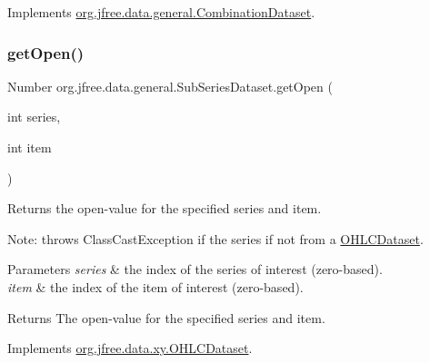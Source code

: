 Implements \mbox{\hyperlink{interfaceorg_1_1jfree_1_1data_1_1general_1_1_combination_dataset_a66aff831b2ae72a85d4485c56f8b0d21}{org.\+jfree.\+data.\+general.\+Combination\+Dataset}}.

\mbox{\label{classorg_1_1jfree_1_1data_1_1general_1_1_sub_series_dataset_aaa997e001d9ecd85cb2ecb628048e3ab}} 
\subsubsection{\texorpdfstring{get\+Open()}{getOpen()}}
{\footnotesize\ttfamily Number org.\+jfree.\+data.\+general.\+Sub\+Series\+Dataset.\+get\+Open (\begin{DoxyParamCaption}\item[{int}]{series,  }\item[{int}]{item }\end{DoxyParamCaption})}

Returns the open-\/value for the specified series and item. 

Note\+: throws {\ttfamily Class\+Cast\+Exception} if the series if not from a \mbox{\hyperlink{}{O\+H\+L\+C\+Dataset}}.


\begin{DoxyParams}{Parameters}
{\em series} & the index of the series of interest (zero-\/based). \\
\hline
{\em item} & the index of the item of interest (zero-\/based).\\
\hline
\end{DoxyParams}
\begin{DoxyReturn}{Returns}
The open-\/value for the specified series and item. 
\end{DoxyReturn}


Implements \mbox{\hyperlink{interfaceorg_1_1jfree_1_1data_1_1xy_1_1_o_h_l_c_dataset_a652f2a7a04925cc72472d390217fef08}{org.\+jfree.\+data.\+xy.\+O\+H\+L\+C\+Dataset}}.

\mbox{\label{classorg_1_1jfree_1_1data_1_1general_1_1_sub_series_dataset_a90452500367ee5658b035fb0e563fe0c}} 
